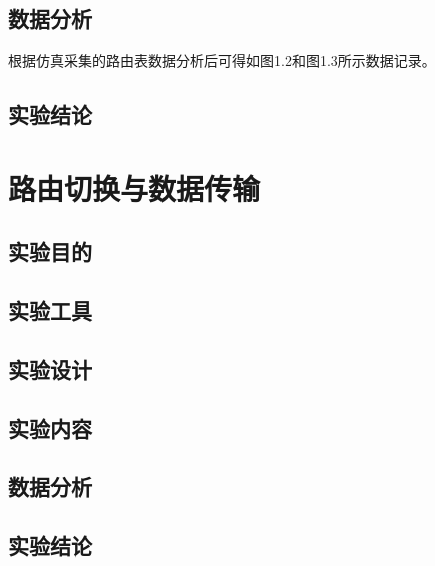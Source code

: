 \documentclass[a4paper,12pt]{report}
\begin{document}
\begin{spacing}{1.5}
\section{数据分析}
根据仿真采集的路由表数据分析后可得如图1.2和图1.3所示数据记录。
\section{实验结论}

\end{spacing}

\chapter{路由切换与数据传输}

\begin{spacing}{1.5}
\section{实验目的}

\section{实验工具}

\section{实验设计}

\section{实验内容}

\section{数据分析}

\section{实验结论}

\end{spacing}

\end{document}
